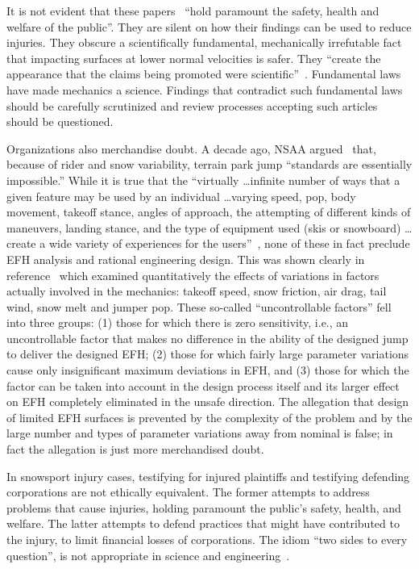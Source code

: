 \documentclass{article}
\begin{document}
It is not evident that these papers~\cite{Shealy2010,Shealy2015,Scher2015}
``hold paramount the safety, health and welfare of the public''. They are
silent on how their findings can be used to reduce injuries. They obscure a
scientifically fundamental, mechanically irrefutable fact that impacting
surfaces at lower normal velocities is safer. They ``create the appearance that
the claims being promoted were scientific''~\cite[page 244]{Oreskes2010}.
Fundamental laws have made mechanics a science. Findings that contradict such
fundamental laws should be carefully scrutinized and review processes accepting
such articles should be questioned.

Organizations also merchandise doubt. A decade ago, NSAA argued~\cite{NSAA2008}
that, because of rider and snow variability, terrain park jump ``standards are
essentially impossible.'' While it is true that the ``virtually \ldots infinite
number of ways that a given feature may be used by an individual \ldots varying
speed, pop, body movement, takeoff stance, angles of approach, the attempting
of different kinds of maneuvers, landing stance, and the type of equipment used
(skis or snowboard) \ldots create a wide variety of experiences for the
users''~\cite{NSAA2008}, none of these in fact preclude EFH analysis and
rational engineering design.  This was shown clearly in
reference~\cite{Hubbard2012} which examined quantitatively the effects of
variations in factors actually involved in the mechanics: takeoff speed, snow
friction, air drag, tail wind, snow melt and jumper pop. These so-called
``uncontrollable factors'' fell into three groups: (1) those for which there is
zero sensitivity, i.e., an uncontrollable factor that makes no difference in
the ability of the designed jump to deliver the designed EFH; (2) those for
which fairly large parameter variations cause only insignificant maximum
deviations in EFH, and (3) those for which the factor can be taken into account
in the design process itself and its larger effect on EFH completely eliminated
in the unsafe direction. The allegation that design of limited EFH surfaces is
prevented by the complexity of the problem and by the large number and types of
parameter variations away from nominal is false; in fact the allegation is just
more merchandised doubt.

In snowsport injury cases, testifying for injured plaintiffs and testifying
defending corporations are not ethically equivalent. The former attempts to
address problems that cause injuries, holding paramount the public's safety,
health, and welfare. The latter attempts to defend practices that might have
contributed to the injury, to limit financial losses of corporations. The idiom
``two sides to every question'', is not appropriate in science and
engineering~\cite[page 268]{Oreskes2010}.
\end{document}
